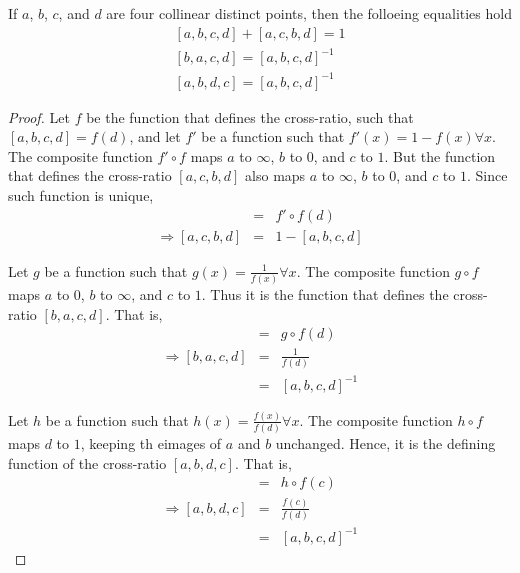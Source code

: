 \begin{prop}
  If $a$, $b$, $c$, and $d$ are four collinear distinct points, then the folloeing equalities
  hold
  \begin{eqnarray*}
    \left[a,b,c,d\right]+\left[a,c,b,d\right]=1 \\
    \left[b,a,c,d\right]=\left[a,b,c,d\right]^{-1} \\
    \left[a,b,d,c\right]=\left[a,b,c,d\right]^{-1}
  \end{eqnarray*}
\end{prop}

\begin{proof}
  Let $f$ be the function that defines the cross-ratio, such that $[a,b,c,d]=f(d)$, and let
  $f'$ be a function such that $f'(x)=1-f(x)\forall x$. The composite function $f'\circ f$ maps
  $a$ to $\infty$, $b$ to $0$, and $c$ to $1$. But the function that defines the cross-ratio
  $[a,c,b,d]$ also maps $a$ to $\infty$, $b$ to $0$, and $c$ to $1$. Since such function is
  unique,
  \begin{eqnarray*}
    [a,c,b,d] &=& f'\circ f(d) \\
    \Longrightarrow [a,c,b,d] &=& 1-[a,b,c,d]
  \end{eqnarray*}

  Let $g$ be a function such that $g(x)=\frac{1}{f(x)}\forall x$. The composite function
  $g\circ f$ maps $a$ to $0$, $b$ to $\infty$, and $c$ to $1$. Thus it is the function that
  defines the cross-ratio $[b,a,c,d]$. That is,
  \begin{eqnarray*}
    [b,a,c,d] &=& g\circ f(d) \\
    \Longrightarrow [b,a,c,d] &=& \frac{1}{f(d)} \\
                              &=& [a,b,c,d]^{-1}
  \end{eqnarray*}

  Let $h$ be a function such that $h(x)=\frac{f(x)}{f(d)}\forall x$. The composite function
  $h\circ f$ maps $d$ to $1$, keeping th eimages of $a$ and $b$ unchanged. Hence, it is the
  defining function of the cross-ratio $[a,b,d,c]$. That is,
  \begin{eqnarray*}
    [a,b,d,c] &=& h\circ f(c) \\
    \Longrightarrow [a,b,d,c] &=& \frac{f(c)}{f(d)} \\
                              &=& [a,b,c,d]^{-1}
  \end{eqnarray*}
\end{proof}

